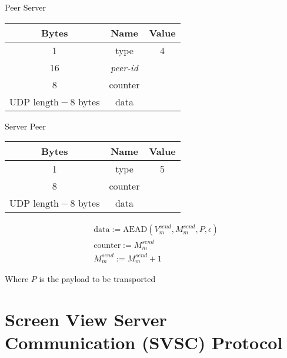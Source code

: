 \documentclass{article}
\begin{document}
    \begin{center}
        Peer \textrightarrow Server\\
        \begin{tabular}{|c|c|c|}
            \hline
            \textbf{Bytes}                & \textbf{Name}  & \textbf{Value} \\
            \hline
            1                             & type           & 4              \\
            \hline
            16                            & \emph{peer-id} &                \\
            \hline
            8                             & counter        &                \\
            \hline
            $\text{UDP length} - 8$ bytes & data           &                \\
            \hline
        \end{tabular}
    \end{center}

    \begin{center}
        Server \textrightarrow Peer\\
        \begin{tabular}{|c|c|c|}
            \hline
            \textbf{Bytes}                & \textbf{Name} & \textbf{Value} \\
            \hline
            1                             & type          & 5              \\
            \hline
            8                             & counter       &                \\
            \hline
            $\text{UDP length} - 8$ bytes & data          &                \\
            \hline
        \end{tabular}
    \end{center}


    \begin{align*}
        & \text{data} := \text{AEAD}(V_{m}^{send}, M_{m}^{send}, P, \epsilon)\\
        & \text{counter} := M_{m}^{send}\\
        & M_{m}^{send} := M_{m}^{send} + 1
    \end{align*}

    Where $P$ is the payload to be transported


    \section{Screen View Server Communication (SVSC) Protocol }
\end{document}
